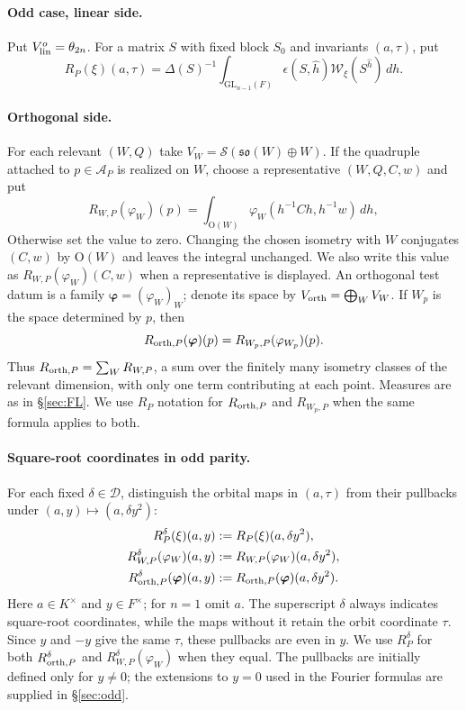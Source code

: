 \documentclass[11pt,oneside,notitlepage]{book}
\numberwithin{equation}{section}
\theoremstyle{plain}
\theoremstyle{definition}
\newcommand{\GL}{\mathrm{GL}}
\newcommand{\Ort}{\mathrm{O}}
\newcommand{\so}{\mathfrak{so}}
\newcommand{\cS}{\mathcal{S}}
\newcommand{\cW}{\mathcal{W}}
\begin{document}
\paragraph{Odd case, linear side.} Put $V^o_{\rm lin}=\theta_{2n}$. For a matrix $S$ with fixed block $S_0$ and invariants $(a,\tau)$, put
\[
 R_P(\xi)(a,\tau)
 =\Delta(S)^{-1}\int_{\GL_{n-1}(F)}
   \epsilon(S,\hat h)\cW_\xi(S^{\hat h})\,dh.
\]

\paragraph{Orthogonal side.} For each relevant $(W,Q)$ take $V_W=\cS(\so(W)\oplus W)$. If the quadruple attached to $p\in\mathcal A_P$ is realized on $W$, choose a representative $(W,Q,C,w)$ and put
\[
 R_{W,P}(\varphi_W)(p)
 =\int_{\Ort(W)}\varphi_W(h^{-1}Ch,h^{-1}w)\,dh,
\]
Otherwise set the value to zero. Changing the chosen isometry with $W$ conjugates $(C,w)$ by $\Ort(W)$ and leaves the integral unchanged. We also write this value as $R_{W,P}(\varphi_W)(C,w)$ when a representative is displayed. An orthogonal test datum is a family $\boldsymbol\varphi=(\varphi_W)_W$; denote its space by $V_{\rm orth}=\bigoplus_W V_W$. If $W_p$ is the space determined by $p$, then
\[
 R_{{\rm orth},P}(\boldsymbol\varphi)(p)
 =R_{W_p,P}(\varphi_{W_p})(p).
\]
Thus $R_{{\rm orth},P}=\sum_W R_{W,P}$, a sum over the finitely many isometry classes of the relevant dimension, with only one term contributing at each point. Measures are as in \S\ref{sec:FL}. We use $R_P$ notation for $R_{{\rm orth},P}$ and $R_{W_p,P}$ when the same formula applies to both.

\paragraph{Square-root coordinates in odd parity.}
For each fixed $\delta\in\mathcal D$, distinguish the orbital maps in $(a,\tau)$ from their pullbacks under $(a,y)\mapsto(a,\delta y^2)$:
\[
 \begin{aligned}
 R_P^\delta(\xi)(a,y)
   &:=R_P(\xi)(a,\delta y^2),\\
 R_{W,P}^\delta(\varphi_W)(a,y)
   &:=R_{W,P}(\varphi_W)(a,\delta y^2),\\
 R_{{\rm orth},P}^\delta(\boldsymbol\varphi)(a,y)
   &:=R_{{\rm orth},P}(\boldsymbol\varphi)(a,\delta y^2).
 \end{aligned}
\]
Here $a\in K^\times$ and $y\in F^\times$; for $n=1$ omit $a$. The superscript $\delta$ always indicates square-root coordinates, while the maps without it retain the orbit coordinate $\tau$. Since $y$ and $-y$ give the same $\tau$, these pullbacks are even in $y$. We use $R_P^\delta$ for both $R_{{\rm orth},P}^\delta$ and $ R_{W,P}^\delta(\varphi_W)$ when they equal. The pullbacks are initially defined only for $y\ne0$; the extensions to $y=0$ used in the Fourier formulas are supplied in \S\ref{sec:odd}.
\end{document}
